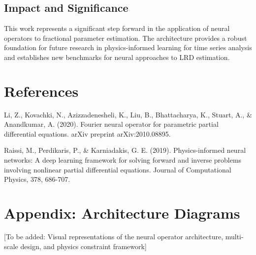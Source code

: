 \documentclass[11pt,a4paper]{article}
\begin{document}
\subsection{Impact and Significance}

This work represents a significant step forward in the application of neural operators to fractional parameter estimation. The architecture provides a robust foundation for future research in physics-informed learning for time series analysis and establishes new benchmarks for neural approaches to LRD estimation.

\section*{References}

\begin{thebibliography}{99}
 Li, Z., Kovachki, N., Azizzadenesheli, K., Liu, B., Bhattacharya, K., Stuart, A., \& Anandkumar, A. (2020). Fourier neural operator for parametric partial differential equations. arXiv preprint arXiv:2010.08895.

 Raissi, M., Perdikaris, P., \& Karniadakis, G. E. (2019). Physics-informed neural networks: A deep learning framework for solving forward and inverse problems involving nonlinear partial differential equations. Journal of Computational Physics, 378, 686-707.

\end{thebibliography}

\section*{Appendix: Architecture Diagrams}

[To be added: Visual representations of the neural operator architecture, multi-scale design, and physics constraint framework]
\end{document}
